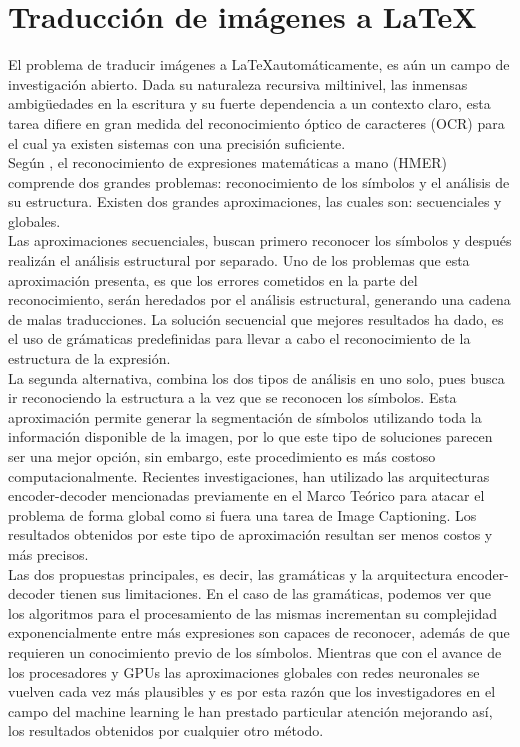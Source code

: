 \section{Traducción de imágenes a \LaTeX}

El problema de traducir imágenes a \LaTeX automáticamente, es aún un campo de investigación abierto. Dada su naturaleza recursiva miltinivel, las inmensas ambigüedades en la escritura y su fuerte dependencia a un contexto claro, esta tarea difiere en gran medida del reconocimiento óptico de caracteres (OCR) para el cual ya existen sistemas con una precisión suficiente. \\

Según \cite{chino}, el reconocimiento de expresiones matemáticas a mano (HMER) comprende dos grandes problemas: reconocimiento de los símbolos y el análisis de su estructura. Existen dos grandes aproximaciones, las cuales son: secuenciales y globales. \\

Las aproximaciones secuenciales, buscan primero reconocer los símbolos y después realizán el análisis estructural por separado. Uno de los problemas que esta aproximación presenta, es que los errores cometidos en la parte del reconocimiento, serán heredados por el análisis estructural, generando una cadena de malas traducciones. La solución secuencial que mejores resultados ha dado, es el uso de grámaticas predefinidas para llevar a cabo el reconocimiento de la estructura de la expresión. \\

La segunda alternativa, combina los dos tipos de análisis en uno solo, pues busca ir reconociendo la estructura a la vez que se reconocen los símbolos. Esta aproximación permite generar la segmentación de símbolos utilizando toda la información disponible de la imagen, por lo que este tipo de soluciones parecen ser una mejor opción, sin embargo, este procedimiento es más costoso computacionalmente. Recientes investigaciones, han utilizado las arquitecturas encoder-decoder mencionadas previamente en el Marco Teórico para atacar el problema de forma global como si fuera una tarea de Image Captioning. Los resultados obtenidos por este tipo de aproximación resultan ser menos costos y más precisos. \\

Las dos propuestas principales, es decir, las gramáticas y la arquitectura encoder-decoder tienen sus limitaciones. En el caso de las gramáticas, podemos ver que los algoritmos para el procesamiento de las mismas incrementan su complejidad exponencialmente entre más expresiones son capaces de reconocer, además de que requieren un conocimiento previo de los símbolos. Mientras que con el avance de los procesadores y GPUs las aproximaciones globales con redes neuronales se vuelven cada vez más plausibles y es por esta razón que los investigadores en el campo del machine learning le han prestado particular atención mejorando así, los resultados obtenidos por cualquier otro método. \\

